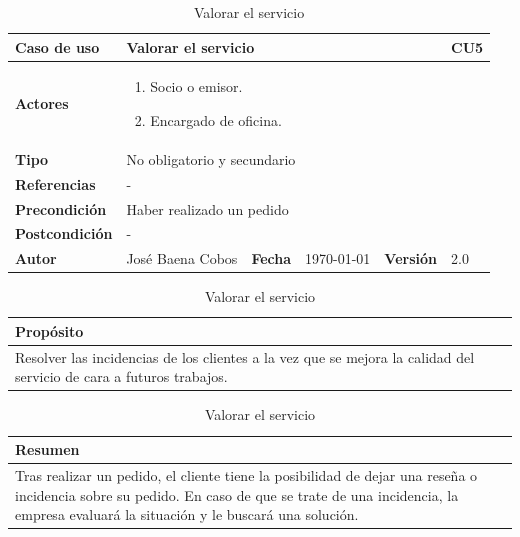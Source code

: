 \documentclass[12pt,spanish]{article}
\begin{document}
\begin{table}[H]
\centering
\begin{tabular}{|m{3cm}|m{4cm}|m{2cm}|m{2cm}|m{2cm}|m{1cm}|}
\hline
\textbf{Caso de uso} &  \multicolumn{4}{m{8cm}|}{Valorar el servicio} \vline &  \cellcolor{gray!40}CU5 \\
\hline
\textbf{Actores} & \multicolumn{5}{m{8cm}|}{\begin{enumerate}
		\item Socio o emisor.
		\item Encargado de oficina.
	\end{enumerate}} \\
\hline
\textbf{Tipo} & \multicolumn{5}{m{8cm}|}{No obligatorio y secundario} \\
\hline
\textbf{Referencias} &\multicolumn{5}{m{8cm}|}{-} \\
\hline
\textbf{Precondición} & \multicolumn{5}{m{8cm}|}{Haber realizado un pedido} \\
\hline
\textbf{Postcondición} & \multicolumn{5}{m{8cm}|}{-} \\
\hline
\textbf{Autor} & José Baena Cobos & \textbf{Fecha} & \today & \textbf{Versión} & 2.0 \\
\hline
\end{tabular}

\vspace{1cm}

\begin{tabular}{|m{16.2cm}|}
\hline
\textbf{Propósito} \\
\hline
Resolver las incidencias de los clientes a la vez que se mejora la calidad del servicio de cara a futuros trabajos. \\
\hline
\end{tabular}

\vspace{1cm}

\begin{tabular}{|m{16.2cm}|}
\hline
\textbf{Resumen} \\
\hline
Tras realizar un pedido, el cliente tiene la posibilidad de dejar una reseña o incidencia sobre su pedido. En caso de que se trate de una incidencia, la empresa evaluará la situación y le buscará una solución. \\
\hline
\end{tabular}

\caption{Valorar el servicio}
\label{cu:5}
\end{table}


\end{document}
